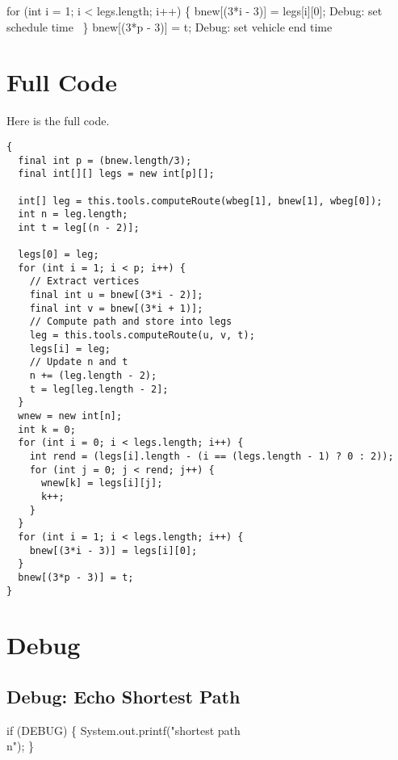 \nwenddocs{}\endmoddef\nwstartdeflinemarkup{}\nwenddeflinemarkup
for (int i = 1; i < legs.length; i++) \{
  bnew[(3*i - 3)] = legs[i][0];
  \LA{}Debug: set schedule time~{\nwtagstyle{}}\RA{}
\}
bnew[(3*p - 3)] = t;
\LA{}Debug: set vehicle end time~{\nwtagstyle{}}\RA{}
\nwendcode{}\nwdocspar

\section{Full Code}

Here is the full code.

\begin{verbatim}
{
  final int p = (bnew.length/3);
  final int[][] legs = new int[p][];

  int[] leg = this.tools.computeRoute(wbeg[1], bnew[1], wbeg[0]);
  int n = leg.length;
  int t = leg[(n - 2)];

  legs[0] = leg;
  for (int i = 1; i < p; i++) {
    // Extract vertices
    final int u = bnew[(3*i - 2)];
    final int v = bnew[(3*i + 1)];
    // Compute path and store into legs
    leg = this.tools.computeRoute(u, v, t);
    legs[i] = leg;
    // Update n and t
    n += (leg.length - 2);
    t = leg[leg.length - 2];
  }
  wnew = new int[n];
  int k = 0;
  for (int i = 0; i < legs.length; i++) {
    int rend = (legs[i].length - (i == (legs.length - 1) ? 0 : 2));
    for (int j = 0; j < rend; j++) {
      wnew[k] = legs[i][j];
      k++;
    }
  }
  for (int i = 1; i < legs.length; i++) {
    bnew[(3*i - 3)] = legs[i][0];
  }
  bnew[(3*p - 3)] = t;
}
\end{verbatim}

\section{Debug}

\subsection{Debug: Echo Shortest Path}

\nwenddocs{}\endmoddef\nwstartdeflinemarkup{}\nwenddeflinemarkup
if (DEBUG) \{
  System.out.printf("shortest path\\n");
\}
\nwendcode{}\nwdocspar

